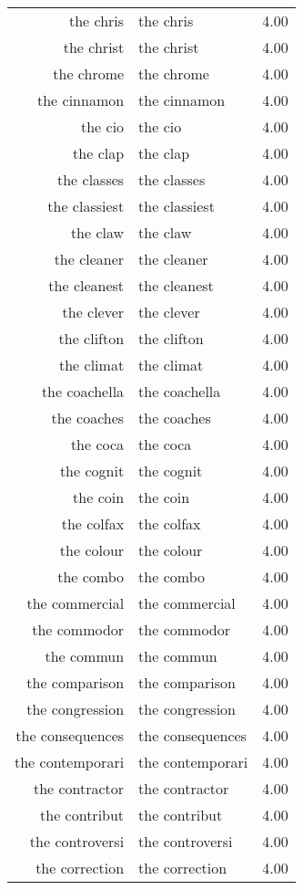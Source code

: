 \begin{table}[ht]
\begin{tabular}{rlr}
  the chris & the chris & 4.00 \\ 
  the christ & the christ & 4.00 \\ 
  the chrome & the chrome & 4.00 \\ 
  the cinnamon & the cinnamon & 4.00 \\ 
  the cio & the cio & 4.00 \\ 
  the clap & the clap & 4.00 \\ 
  the classes & the classes & 4.00 \\ 
  the classiest & the classiest & 4.00 \\ 
  the claw & the claw & 4.00 \\ 
  the cleaner & the cleaner & 4.00 \\ 
  the cleanest & the cleanest & 4.00 \\ 
  the clever & the clever & 4.00 \\ 
  the clifton & the clifton & 4.00 \\ 
  the climat & the climat & 4.00 \\ 
  the coachella & the coachella & 4.00 \\ 
  the coaches & the coaches & 4.00 \\ 
  the coca & the coca & 4.00 \\ 
  the cognit & the cognit & 4.00 \\ 
  the coin & the coin & 4.00 \\ 
  the colfax & the colfax & 4.00 \\ 
  the colour & the colour & 4.00 \\ 
  the combo & the combo & 4.00 \\ 
  the commercial & the commercial & 4.00 \\ 
  the commodor & the commodor & 4.00 \\ 
  the commun & the commun & 4.00 \\ 
  the comparison & the comparison & 4.00 \\ 
  the congression & the congression & 4.00 \\ 
  the consequences & the consequences & 4.00 \\ 
  the contemporari & the contemporari & 4.00 \\ 
  the contractor & the contractor & 4.00 \\ 
  the contribut & the contribut & 4.00 \\ 
  the controversi & the controversi & 4.00 \\ 
  the correction & the correction & 4.00 \\ 

\end{tabular}
\end{table}
